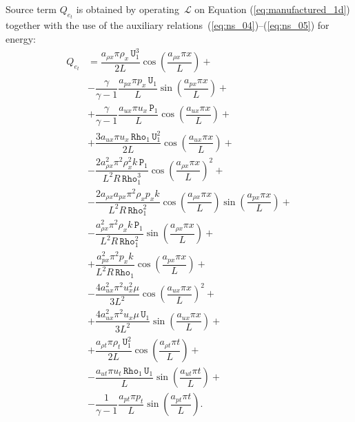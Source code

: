 \documentclass[10pt]{article}
\newcommand{\Rho}{\,\mathtt{Rho}}
\newcommand{\PP}{\,\mathtt{P}}
\newcommand{\U}{\,\mathtt{U}}
\newcommand{\Lo}{\,\mathcal{L}}
\begin{document}
Source term $Q_{e_t}$ is obtained by operating $\Lo$ on Equation  (\ref{eq:manufactured_1d}) together with the use of the  auxiliary relations~(\ref{eq:ns_04})--(\ref{eq:ns_05}) for energy:
  \begin{equation}\label{eq:source_e}
 \begin{split}
Q_{e_t} &= \dfrac{a_{\rho x} \pi \rho_x \U_1^3 }{2L}\cos\left(\dfrac{a_{\rho x} \pi x}{L}\right)+\\
&- \dfrac{\gamma}{\gamma-1}\dfrac{a_{px} \pi p_x \U_1}{L}\sin\left(\dfrac{a_{px} \pi x}{L}\right) +\\
&+ \dfrac{\gamma}{\gamma-1}\dfrac{a_{ux} \pi u_x \PP_1}{L}\cos\left(\dfrac{a_{ux} \pi x}{L}\right)  +\\
&+ \dfrac{ 3 a_{ux} \pi u_x \Rho_1 \U_1^2 }{2L}\cos\left(\dfrac{a_{ux} \pi x}{L}\right)+\\
&-\dfrac{2 a_{\rho x}^2 \pi^2 \rho_x^2 k \PP_1}{L^2 R \Rho_1^3}\cos\left(\dfrac{a_{\rho x} \pi x}{L}\right)^2 +\\
&-\dfrac{2 a_{\rho x} a_{px} \pi^2 \rho_x p_x k }{L^2 R \Rho_1^2}\cos\left(\dfrac{a_{\rho x} \pi x}{L}\right) \sin\left(\dfrac{a_{px} \pi x}{L}\right) +\\
&-\dfrac{a_{\rho x}^2 \pi^2 \rho_x k \PP_1 }{L^2 R \Rho_1^2}\sin\left(\dfrac{a_{\rho x} \pi x}{L}\right) +\\
&+\dfrac{a_{px}^2 \pi^2 p_x k }{L^2 R \Rho_1}\cos\left(\dfrac{a_{px} \pi x}{L}\right) +\\
&-\dfrac{4a_{ux}^2 \pi^2 u_x^2 \mu }{3L^2}\cos\left(\dfrac{a_{ux} \pi x}{L}\right)^2 +\\
&+\dfrac{4a_{ux}^2 \pi^2 u_x \mu \U_1 }{3L^2}\sin\left(\dfrac{a_{ux} \pi x}{L}\right)+\\
&+\dfrac{a_{\rho t} \pi \rho_t \U_1^2}{2L}\cos\left(\dfrac{a_{\rho t} \pi t}{L}\right)+\\
&-\dfrac{a_{ut} \pi u_t  \Rho_1 \U_1 }{L}\sin\left(\dfrac{a_{ut} \pi t}{L}\right)+\\
&-\dfrac{1}{\gamma-1}\dfrac{a_{pt} \pi p_t }{L}\sin\left(\dfrac{a_{pt} \pi t}{L}\right).
 \end{split}
\end{equation}
\end{document}
